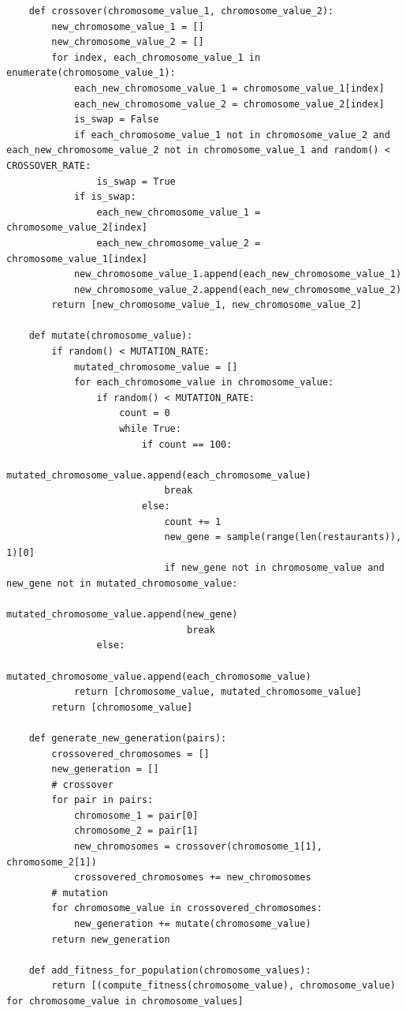 \documentclass[12pt,oneside,openright,a4paper]{cpe-english-project}
\begin{document}
\begin{lstlisting}
    def crossover(chromosome_value_1, chromosome_value_2):
        new_chromosome_value_1 = []
        new_chromosome_value_2 = []
        for index, each_chromosome_value_1 in enumerate(chromosome_value_1):
            each_new_chromosome_value_1 = chromosome_value_1[index]
            each_new_chromosome_value_2 = chromosome_value_2[index]
            is_swap = False
            if each_chromosome_value_1 not in chromosome_value_2 and each_new_chromosome_value_2 not in chromosome_value_1 and random() < CROSSOVER_RATE:
                is_swap = True
            if is_swap:
                each_new_chromosome_value_1 = chromosome_value_2[index]
                each_new_chromosome_value_2 = chromosome_value_1[index]
            new_chromosome_value_1.append(each_new_chromosome_value_1)
            new_chromosome_value_2.append(each_new_chromosome_value_2)
        return [new_chromosome_value_1, new_chromosome_value_2]

    def mutate(chromosome_value):
        if random() < MUTATION_RATE:
            mutated_chromosome_value = []
            for each_chromosome_value in chromosome_value:
                if random() < MUTATION_RATE:
                    count = 0
                    while True:
                        if count == 100:
                            mutated_chromosome_value.append(each_chromosome_value)
                            break
                        else:
                            count += 1
                            new_gene = sample(range(len(restaurants)), 1)[0]
                            if new_gene not in chromosome_value and new_gene not in mutated_chromosome_value:
                                mutated_chromosome_value.append(new_gene)
                                break
                else:
                    mutated_chromosome_value.append(each_chromosome_value)
            return [chromosome_value, mutated_chromosome_value]
        return [chromosome_value]

    def generate_new_generation(pairs):
        crossovered_chromosomes = []
        new_generation = []
        # crossover
        for pair in pairs:
            chromosome_1 = pair[0]
            chromosome_2 = pair[1]
            new_chromosomes = crossover(chromosome_1[1], chromosome_2[1])
            crossovered_chromosomes += new_chromosomes
        # mutation
        for chromosome_value in crossovered_chromosomes:
            new_generation += mutate(chromosome_value)
        return new_generation

    def add_fitness_for_population(chromosome_values):
        return [(compute_fitness(chromosome_value), chromosome_value) for chromosome_value in chromosome_values]


\end{lstlisting}
\end{document}
